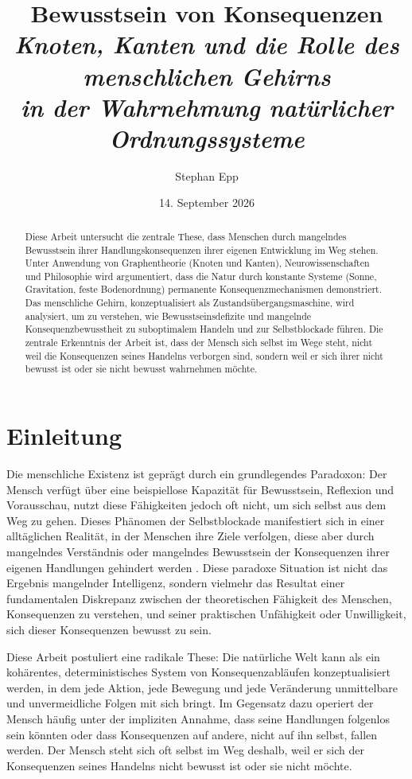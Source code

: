 \documentclass[12pt,a4paper]{article}
\title{\Large \textbf{Bewusstsein von Konsequenzen}\\
\textit{Knoten, Kanten und die Rolle des menschlichen Gehirns\\
in der Wahrnehmung natürlicher Ordnungssysteme}}
\author{Stephan Epp}
\date{14. September 2026}
\begin{document}
\maketitle

\begin{abstract}
Diese Arbeit untersucht die zentrale These, dass Menschen durch mangelndes Bewusstsein ihrer Handlungskonsequenzen ihrer eigenen Entwicklung im Weg stehen. Unter Anwendung von Graphentheorie (Knoten und Kanten), Neurowissenschaften und Philosophie wird argumentiert, dass die Natur durch konstante Systeme (Sonne, Gravitation, feste Bodenordnung) permanente Konsequenzmechanismen demonstriert. Das menschliche Gehirn, konzeptualisiert als Zustandsübergangsmaschine, wird analysiert, um zu verstehen, wie Bewusstseinsdefizite und mangelnde Konsequenzbewusstheit zu suboptimalem Handeln und zur Selbstblockade führen. Die zentrale Erkenntnis der Arbeit ist, dass der Mensch sich selbst im Wege steht, nicht weil die Konsequenzen seines Handelns verborgen sind, sondern weil er sich ihrer nicht bewusst ist oder sie nicht bewusst wahrnehmen möchte.
\end{abstract}

\tableofcontents

\newpage

\section{Einleitung}

Die menschliche Existenz ist geprägt durch ein grundlegendes Paradoxon: Der Mensch verfügt über eine beispiellose Kapazität für Bewusstsein, Reflexion und Vorausschau, nutzt diese Fähigkeiten jedoch oft nicht, um sich selbst aus dem Weg zu gehen. Dieses Phänomen der Selbstblockade manifestiert sich in einer alltäglichen Realität, in der Menschen ihre Ziele verfolgen, diese aber durch mangelndes Verständnis oder mangelndes Bewusstsein der Konsequenzen ihrer eigenen Handlungen gehindert werden \cite{jonas2003prinzip}. Diese paradoxe Situation ist nicht das Ergebnis mangelnder Intelligenz, sondern vielmehr das Resultat einer fundamentalen Diskrepanz zwischen der theoretischen Fähigkeit des Menschen, Konsequenzen zu verstehen, und seiner praktischen Unfähigkeit oder Unwilligkeit, sich dieser Konsequenzen bewusst zu sein.

Diese Arbeit postuliert eine radikale These: Die natürliche Welt kann als ein kohärentes, deterministisches System von Konsequenzabläufen konzeptualisiert werden, in dem jede Aktion, jede Bewegung und jede Veränderung unmittelbare und unvermeidliche Folgen mit sich bringt. Im Gegensatz dazu operiert der Mensch häufig unter der impliziten Annahme, dass seine Handlungen folgenlos sein könnten oder dass Konsequenzen auf andere, nicht auf ihn selbst, fallen werden. Der Mensch steht sich oft selbst im Weg deshalb, weil er sich der Konsequenzen seines Handelns nicht bewusst ist oder sie nicht möchte. 
\end{document}
